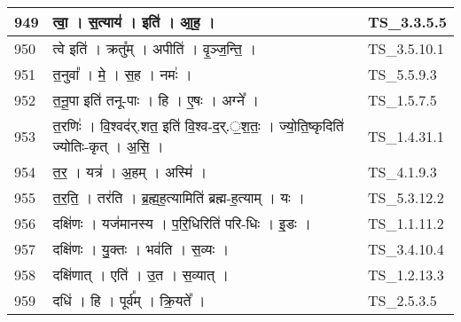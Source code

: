 \documentclass[17pt]{extarticle}
\begin{document}
\begin{longtable}{||p{0.4in}||p{4.9in}||p{0.9in}||}
    \hline
        
    949 & त्वा॒   ।   स॒त्याय॑   ।   इति॑   ।   आ॒ह॒   ।    & TS\_3.3.5.5       \\
    
    \hline
        
    950 & त्वे इति॑   ।   क्रतु᳚म्   ।   अपीति॑   ।   वृ॒ञ्ज॒न्ति॒   ।    & TS\_3.5.10.1       \\
    
    \hline
        
    951 & त॒नुवा᳚   ।   मे॒   ।   स॒ह   ।   नमः॑   ।    & TS\_5.5.9.3       \\
    
    \hline
        
    952 & त॒नू॒पा इति॑ तनू{-}पाः   ।   हि   ।   ए॒षः   ।   अग्ने᳚   ।    & TS\_1.5.7.5       \\
    
    \hline
        
    953 & त॒रणिः॑   ।   वि॒श्वद॑र्.शत॒ इति॑ वि॒श्व{-}द॒र्.॒श॒तः॒   ।   ज्यो॒ति॒ष्कृदिति॑ ज्योतिः{-}कृत्   ।   अ॒सि॒   ।    & TS\_1.4.31.1       \\
    
    \hline
        
    954 & त॒र॒   ।   यत्र॑   ।   अ॒हम्   ।   अस्मि॑   ।    & TS\_4.1.9.3       \\
    
    \hline
        
    955 & त॒र॒ति॒   ।   तर॑ति   ।   ब्र॒ह्म॒ह॒त्यामिति॑ ब्रह्म{-}ह॒त्याम्   ।   यः   ।    & TS\_5.3.12.2       \\
    
    \hline
        
    956 & दक्षि॑णः   ।   यज॑मानस्य   ।   प॒रि॒धिरिति॑ परि{-}धिः   ।   इ॒डः   ।    & TS\_1.1.11.2       \\
    
    \hline
        
    957 & दक्षि॑णः   ।   यु॒क्तः   ।   भव॑ति   ।   स॒व्यः   ।    & TS\_3.4.10.4       \\
    
    \hline
        
    958 & दक्षि॑णात्   ।   एति॑   ।   उ॒त   ।   स॒व्यात्   ।    & TS\_1.2.13.3       \\
    
    \hline
        
    959 & दधि॑   ।   हि   ।   पूर्व᳚म्   ।   क्रि॒यते᳚   ।    & TS\_2.5.3.5       \\
    

\end{longtable}
\end{document}
